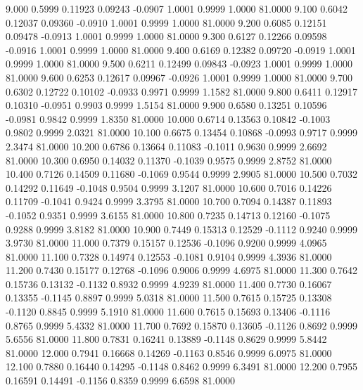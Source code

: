    9.000   0.5999   0.11923   0.09243  -0.0907   1.0001   0.9999   1.0000  81.0000
   9.100   0.6042   0.12037   0.09360  -0.0910   1.0001   0.9999   1.0000  81.0000
   9.200   0.6085   0.12151   0.09478  -0.0913   1.0001   0.9999   1.0000  81.0000
   9.300   0.6127   0.12266   0.09598  -0.0916   1.0001   0.9999   1.0000  81.0000
   9.400   0.6169   0.12382   0.09720  -0.0919   1.0001   0.9999   1.0000  81.0000
   9.500   0.6211   0.12499   0.09843  -0.0923   1.0001   0.9999   1.0000  81.0000
   9.600   0.6253   0.12617   0.09967  -0.0926   1.0001   0.9999   1.0000  81.0000
   9.700   0.6302   0.12722   0.10102  -0.0933   0.9971   0.9999   1.1582  81.0000
   9.800   0.6411   0.12917   0.10310  -0.0951   0.9903   0.9999   1.5154  81.0000
   9.900   0.6580   0.13251   0.10596  -0.0981   0.9842   0.9999   1.8350  81.0000
  10.000   0.6714   0.13563   0.10842  -0.1003   0.9802   0.9999   2.0321  81.0000
  10.100   0.6675   0.13454   0.10868  -0.0993   0.9717   0.9999   2.3474  81.0000
  10.200   0.6786   0.13664   0.11083  -0.1011   0.9630   0.9999   2.6692  81.0000
  10.300   0.6950   0.14032   0.11370  -0.1039   0.9575   0.9999   2.8752  81.0000
  10.400   0.7126   0.14509   0.11680  -0.1069   0.9544   0.9999   2.9905  81.0000
  10.500   0.7032   0.14292   0.11649  -0.1048   0.9504   0.9999   3.1207  81.0000
  10.600   0.7016   0.14226   0.11709  -0.1041   0.9424   0.9999   3.3795  81.0000
  10.700   0.7094   0.14387   0.11893  -0.1052   0.9351   0.9999   3.6155  81.0000
  10.800   0.7235   0.14713   0.12160  -0.1075   0.9288   0.9999   3.8182  81.0000
  10.900   0.7449   0.15313   0.12529  -0.1112   0.9240   0.9999   3.9730  81.0000
  11.000   0.7379   0.15157   0.12536  -0.1096   0.9200   0.9999   4.0965  81.0000
  11.100   0.7328   0.14974   0.12553  -0.1081   0.9104   0.9999   4.3936  81.0000
  11.200   0.7430   0.15177   0.12768  -0.1096   0.9006   0.9999   4.6975  81.0000
  11.300   0.7642   0.15736   0.13132  -0.1132   0.8932   0.9999   4.9239  81.0000
  11.400   0.7730   0.16067   0.13355  -0.1145   0.8897   0.9999   5.0318  81.0000
  11.500   0.7615   0.15725   0.13308  -0.1120   0.8845   0.9999   5.1910  81.0000
  11.600   0.7615   0.15693   0.13406  -0.1116   0.8765   0.9999   5.4332  81.0000
  11.700   0.7692   0.15870   0.13605  -0.1126   0.8692   0.9999   5.6556  81.0000
  11.800   0.7831   0.16241   0.13889  -0.1148   0.8629   0.9999   5.8442  81.0000
  12.000   0.7941   0.16668   0.14269  -0.1163   0.8546   0.9999   6.0975  81.0000
  12.100   0.7880   0.16440   0.14295  -0.1148   0.8462   0.9999   6.3491  81.0000
  12.200   0.7955   0.16591   0.14491  -0.1156   0.8359   0.9999   6.6598  81.0000
